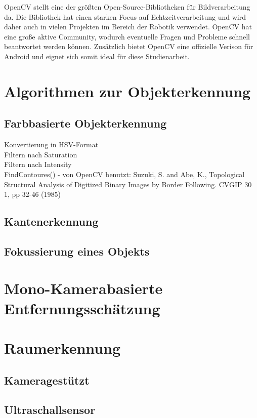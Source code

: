 OpenCV \cite{bradski2008learning} stellt eine der größten Open-Source-Bibliotheken für Bildverarbeitung da. Die Bibliothek hat einen starken Focus auf Echtzeitverarbeitung und wird daher auch in vielen Projekten im Bereich der Robotik verwendet. OpenCV hat eine große aktive Community, wodurch eventuelle Fragen und Probleme schnell beantwortet werden können. Zusätzlich bietet OpenCV eine offizielle Verison für Android und eignet sich somit ideal für diese Studienarbeit.


\section{Algorithmen zur Objekterkennung}


\subsection{Farbbasierte Objekterkennung}
Konvertierung in HSV-Format\\
Filtern nach Saturation\\
Filtern nach Intensity\\
FindContoures() - von OpenCV benutzt:
Suzuki, S. and Abe, K., Topological Structural Analysis of Digitized Binary Images by Border Following. CVGIP 30 1, pp 32-46 (1985)

\subsection{Kantenerkennung}
\subsection{Fokussierung eines Objekts}

\section{Mono-Kamerabasierte Entfernungsschätzung}


\section{Raumerkennung}
\subsection{Kameragestützt}
\subsection{Ultraschallsensor}
